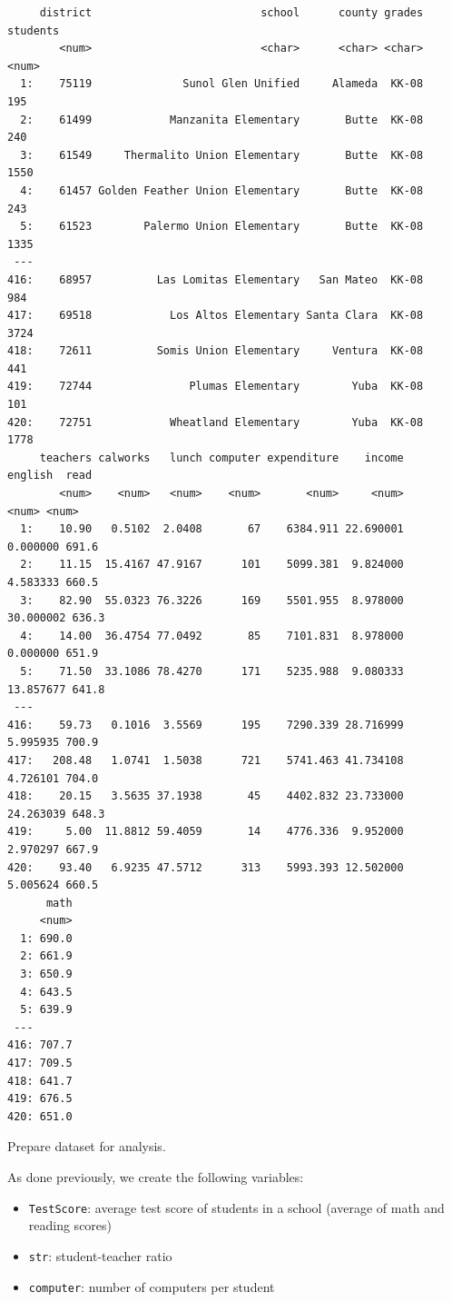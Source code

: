 \documentclass[
  12pt,
  a4paper,
]{scrbook}
\providecommand{\tightlist}{%
  \setlength{\itemsep}{0pt}\setlength{\parskip}{0pt}}
\renewcommand{\tightlist}{\setlength{\itemsep}{0.5\baselineskip}\setlength{\parskip}{0.2\baselineskip}}
\theoremstyle{plain}
\theoremstyle{definition}
\theoremstyle{remark}
\begin{document}
\begin{verbatim}
     district                          school      county grades students
        <num>                          <char>      <char> <char>    <num>
  1:    75119              Sunol Glen Unified     Alameda  KK-08      195
  2:    61499            Manzanita Elementary       Butte  KK-08      240
  3:    61549     Thermalito Union Elementary       Butte  KK-08     1550
  4:    61457 Golden Feather Union Elementary       Butte  KK-08      243
  5:    61523        Palermo Union Elementary       Butte  KK-08     1335
 ---                                                                     
416:    68957          Las Lomitas Elementary   San Mateo  KK-08      984
417:    69518            Los Altos Elementary Santa Clara  KK-08     3724
418:    72611          Somis Union Elementary     Ventura  KK-08      441
419:    72744               Plumas Elementary        Yuba  KK-08      101
420:    72751            Wheatland Elementary        Yuba  KK-08     1778
     teachers calworks   lunch computer expenditure    income   english  read
        <num>    <num>   <num>    <num>       <num>     <num>     <num> <num>
  1:    10.90   0.5102  2.0408       67    6384.911 22.690001  0.000000 691.6
  2:    11.15  15.4167 47.9167      101    5099.381  9.824000  4.583333 660.5
  3:    82.90  55.0323 76.3226      169    5501.955  8.978000 30.000002 636.3
  4:    14.00  36.4754 77.0492       85    7101.831  8.978000  0.000000 651.9
  5:    71.50  33.1086 78.4270      171    5235.988  9.080333 13.857677 641.8
 ---                                                                         
416:    59.73   0.1016  3.5569      195    7290.339 28.716999  5.995935 700.9
417:   208.48   1.0741  1.5038      721    5741.463 41.734108  4.726101 704.0
418:    20.15   3.5635 37.1938       45    4402.832 23.733000 24.263039 648.3
419:     5.00  11.8812 59.4059       14    4776.336  9.952000  2.970297 667.9
420:    93.40   6.9235 47.5712      313    5993.393 12.502000  5.005624 660.5
      math
     <num>
  1: 690.0
  2: 661.9
  3: 650.9
  4: 643.5
  5: 639.9
 ---      
416: 707.7
417: 709.5
418: 641.7
419: 676.5
420: 651.0
\end{verbatim}

Prepare dataset for analysis.

As done previously, we create the following variables:

\begin{itemize}
\tightlist
\item
  \texttt{TestScore}: average test score of students in a school
  (average of math and reading scores)
\item
  \texttt{str}: student-teacher ratio
\item
  \texttt{computer}: number of computers per student
\end{itemize}
\end{document}
